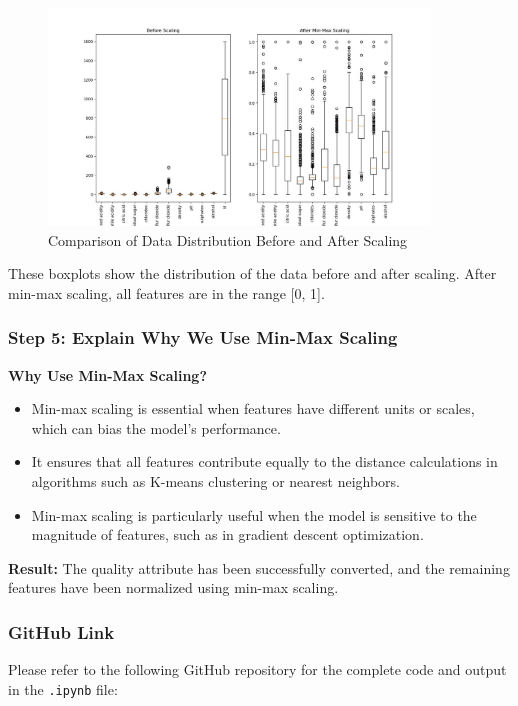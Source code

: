 \documentclass{exam}
\begin{document}
\begin{figure}[h!]
    \centering
    \includegraphics[width=0.9\textwidth]{images/scaling_comparison_plot.jpg}
    \caption{Comparison of Data Distribution Before and After Scaling}
    \label{fig:scaling_comparison}
\end{figure}

These boxplots show the distribution of the data before and after scaling. After min-max scaling, all features are in the range [0, 1].

\subsubsection{Step 5: Explain Why We Use Min-Max Scaling}

\textbf{Why Use Min-Max Scaling?}
\begin{itemize}
    \item Min-max scaling is essential when features have different units or scales, which can bias the model's performance.
    \item It ensures that all features contribute equally to the distance calculations in algorithms such as K-means clustering or nearest neighbors.
    \item Min-max scaling is particularly useful when the model is sensitive to the magnitude of features, such as in gradient descent optimization.
\end{itemize}

\textbf{Result:} The quality attribute has been successfully converted, and the remaining features have been normalized using min-max scaling.

\subsubsection{GitHub Link}

Please refer to the following GitHub repository for the complete code and output in the \texttt{.ipynb} file:
\end{document}
